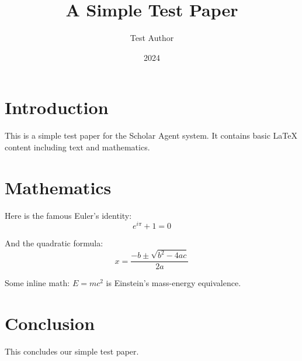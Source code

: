 \documentclass{article}
\title{A Simple Test Paper}
\author{Test Author}
\date{2024}
\begin{document}
\maketitle

\section{Introduction}

This is a simple test paper for the Scholar Agent system.
It contains basic LaTeX content including text and mathematics.

\section{Mathematics}

Here is the famous Euler's identity:
\begin{equation}
e^{i\pi} + 1 = 0
\end{equation}

And the quadratic formula:
\begin{equation}
x = \frac{-b \pm \sqrt{b^2 - 4ac}}{2a}
\end{equation}

Some inline math: $E = mc^2$ is Einstein's mass-energy equivalence.

\section{Conclusion}

This concludes our simple test paper.
\end{document}
